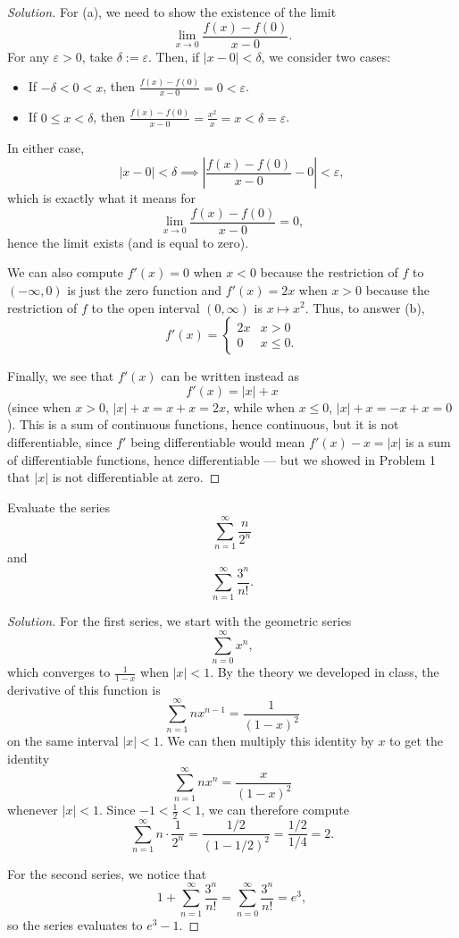 \documentclass[11pt]{scrartcl}
\providecommand{\eps}{\varepsilon}
\providecommand{\half}{\frac{1}{2}}
\providecommand{\ii}{\item}
\newenvironment{soln}{\begin{proof}[Solution]}{\end{proof}}
\providecommand{\abs}[1]{\left|#1\right|}
\begin{document}
\begin{soln}
	For (a), we need to show the existence of the limit
	\[\lim_{x\to0} \frac{f(x) - f(0)}{x - 0}.\]
	For any $\eps > 0$, take $\delta := \eps$. Then,
	if $|x - 0| < \delta$, we consider two cases:
	\begin{itemize}
		\ii If $-\delta < 0 < x$, then $\frac{f(x) - f(0)}{x - 0} = 0 < \eps$.
		\ii If $0\le x < \delta$, then
		$\frac{f(x) - f(0)}{x - 0} = \frac{x^2}{x} = x < \delta = \eps$.
	\end{itemize}
	In either case,
	\[|x - 0| < \delta \implies \abs{\frac{f(x) - f(0)}{x - 0} - 0} < \eps,\]
	which is exactly what it means for
	\[\lim_{x\to 0} \frac{f(x) - f(0)}{x - 0} = 0,\]
	hence the limit exists (and is equal to zero).
	
	We can also compute $f'(x) = 0$ when $x < 0$
	because the restriction of $f$ to $(-\infty, 0)$ is just the zero function
	and $f'(x) = 2x$ when $x > 0$
	because the restriction of $f$ to the open interval $(0,\infty)$
	is $x\mapsto x^2$. Thus, to answer (b),
	\[f'(x) = \begin{cases}
		2x & x > 0\\
		0 & x \le 0.
	\end{cases}\]
	
	Finally, we see that $f'(x)$ can be written instead as
	\[f'(x) = |x| + x\]
	(since when $x > 0$, $|x| + x = x + x = 2x$, while
	when $x \le 0$, $|x| + x = -x + x = 0$).
	This is a sum of continuous functions, hence continuous,
	but it is not differentiable, since $f'$ being differentiable
	would mean $f'(x) - x = |x|$ is a sum of differentiable functions,
	hence differentiable --- but we showed in Problem 1 that
	$|x|$ is not differentiable at zero.
\end{soln}

\setcounter{problem}{4}

\begin{problem}
	Evaluate the series
	\[\sum_{n=1}^\infty \frac{n}{2^n}\]
	and
	\[\sum_{n=1}^\infty \frac{3^n}{n!}.\]
\end{problem}

\begin{soln}
	For the first series, we start with the geometric series
	\[\sum_{n=0}^\infty x^n,\]
	which converges to $\frac{1}{1-x}$ when $|x| < 1$.
	By the theory we developed in class, the derivative of this function is
	\[\sum_{n=1}^\infty nx^{n-1} = \frac{1}{(1-x)^2}\]
	on the same interval $|x| < 1$.
	We can then multiply this identity by $x$ to get the identity
	\[\sum_{n=1}^\infty nx^n = \frac{x}{(1-x)^2}\]
	whenever $|x| < 1$. Since $-1 < \half < 1$, we can therefore compute
	\[\sum_{n=1}^\infty n\cdot\frac{1}{2^n} =
	\frac{1/2}{(1 - 1/2)^2} = \frac{1/2}{1/4} = \boxed 2.\]
	
	For the second series, we notice that
	\[1 + \sum_{n=1}^\infty \frac{3^n}{n!} =
	\sum_{n=0}^\infty \frac{3^n}{n!} = e^3,\]
	so the series evaluates to $\boxed{e^3 - 1}$.
\end{soln}
\end{document}
